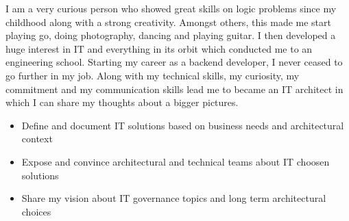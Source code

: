\documentclass[10pt,a4paper,ragged2e]{src/altacv}
\begin{document}




\begin{fullwidth}
\makecvheader



\end{fullwidth}



I am a very curious person who showed great skills on logic problems since my childhood along with a strong creativity. Amongst others, this made me start playing go, doing photography, dancing and playing guitar. 
I then developed a huge interest in IT and everything in its orbit which conducted me to an engineering school.
Starting my career as a backend developer, I never ceased to go further in my job.
Along with my technical skills, my curiosity, my commitment and my communication skills lead me to became an IT architect 
in which I can share my thoughts about a bigger pictures.


\begin{itemize}
\item Define and document IT solutions based on business needs and architectural context
\item Expose and convince architectural and technical teams about IT choosen solutions
\item Share my vision about IT governance topics and long term architectural choices
\end{itemize}
\end{document}
